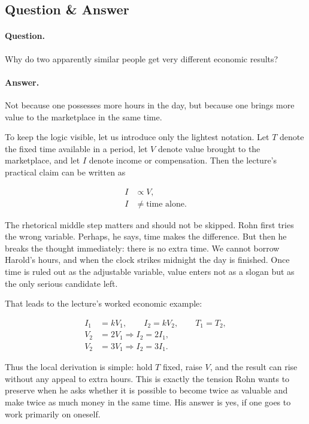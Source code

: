 \subsection{Question \& Answer}

\paragraph{Question.} Why do two apparently similar people get very different economic results?

\paragraph{Answer.} Not because one possesses more hours in the day, but because one brings more value to the marketplace in the same time.

To keep the logic visible, let us introduce only the lightest notation. Let \(T\) denote the fixed time available in a period, let \(V\) denote value brought to the marketplace, and let \(I\) denote income or compensation. Then the lecture's practical claim can be written as

\begin{align}
I &\propto V,\\
I &\neq \text{time alone}.
\end{align}

The rhetorical middle step matters and should not be skipped. Rohn first tries the wrong variable. Perhaps, he says, time makes the difference. But then he breaks the thought immediately: there is no extra time. We cannot borrow Harold's hours, and when the clock strikes midnight the day is finished. Once time is ruled out as the adjustable variable, value enters not as a slogan but as the only serious candidate left.

That leads to the lecture's worked economic example:

\begin{align}
I_1 &= kV_1, \qquad I_2 = kV_2, \qquad T_1=T_2,\\
V_2 &= 2V_1 \Longrightarrow I_2 = 2I_1,\\
V_2 &= 3V_1 \Longrightarrow I_2 = 3I_1.
\end{align}

Thus the local derivation is simple: hold \(T\) fixed, raise \(V\), and the result can rise without any appeal to extra hours. This is exactly the tension Rohn wants to preserve when he asks whether it is possible to become twice as valuable and make twice as much money in the same time. His answer is yes, if one goes to work primarily on oneself.


